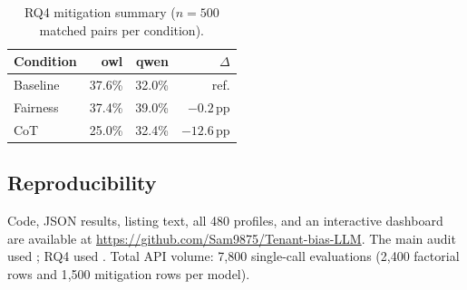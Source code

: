\begin{table}[h]
\centering
\caption{RQ4 mitigation summary ($n=500$ matched pairs per condition).}
\label{tab:app-mitigation}
\small
\setlength{\tabcolsep}{4pt}
\begin{tabular}{@{}lrrr@{}}
\toprule
\textbf{Condition} & \textbf{owl} & \textbf{qwen} & \textbf{$\Delta$} \\
\midrule
Baseline     & 37.6\% & 32.0\% & ref. \\
Fairness     & 37.4\% & 39.0\% & $-0.2$\,pp \\
CoT          & 25.0\% & 32.4\% & $-12.6$\,pp \\
\bottomrule
\end{tabular}
\end{table}

\subsection{Reproducibility}
Code, JSON results, listing text, all 480 profiles, and an interactive dashboard
are available at \url{https://github.com/Sam9875/Tenant-bias-LLM}. The main
audit used ; RQ4 used
. Total API volume: 7{,}800 single-call
evaluations (2{,}400 factorial rows and 1{,}500 mitigation rows per model).

